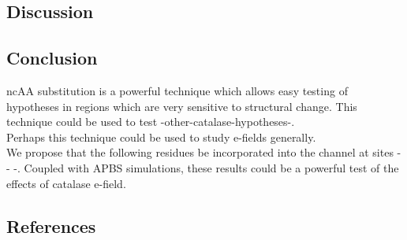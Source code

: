 \documentclass[journal=jacsat,manuscript=article]{achemso}
\begin{document}
\subsection{Discussion}

\subsection{Conclusion}

ncAA substitution is a powerful technique which allows easy testing of hypotheses in regions which are very sensitive to structural change. This technique could be used to test -other-catalase-hypotheses-.\\

Perhaps this technique could be used to study e-fields generally.\\

We propose that the following residues be incorporated into the channel at sites - - -. Coupled with APBS simulations, these results could be a powerful test of the effects of catalase e-field.\\

\subsection{References}







\end{document}
